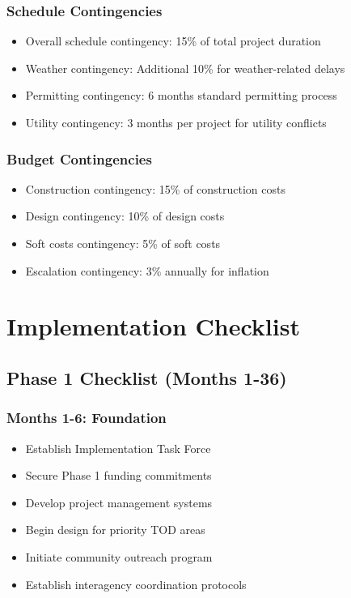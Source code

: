 \documentclass[11pt,letterpaper]{article}
\begin{document}
\subsubsection{Schedule Contingencies}
\begin{itemize}
    \item Overall schedule contingency: 15\% of total project duration
    \item Weather contingency: Additional 10\% for weather-related delays
    \item Permitting contingency: 6 months standard permitting process
    \item Utility contingency: 3 months per project for utility conflicts
\end{itemize}

\subsubsection{Budget Contingencies}
\begin{itemize}
    \item Construction contingency: 15\% of construction costs
    \item Design contingency: 10\% of design costs
    \item Soft costs contingency: 5\% of soft costs
    \item Escalation contingency: 3\% annually for inflation
\end{itemize}

\section{Implementation Checklist}

\subsection{Phase 1 Checklist (Months 1-36)}

\subsubsection{Months 1-6: Foundation}
\begin{itemize}
    \item[$\square$] Establish Implementation Task Force
    \item[$\square$] Secure Phase 1 funding commitments
    \item[$\square$] Develop project management systems
    \item[$\square$] Begin design for priority TOD areas
    \item[$\square$] Initiate community outreach program
    \item[$\square$] Establish interagency coordination protocols
\end{itemize}
\end{document}
